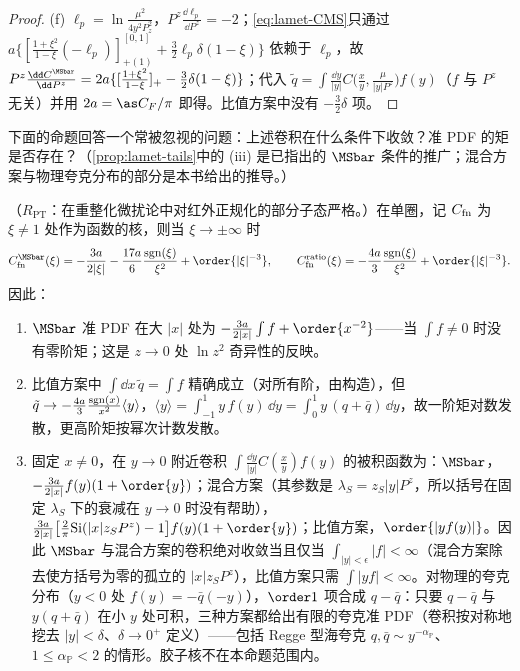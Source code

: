 \begin{proof}
(f) $\ell_p=\ln\frac{\mu^2}{4y^2P_z^2}$，$P^z\frac{\dd\ell_p}{\dd P^z}=-2$；\cref{eq:lamet-CMS}只通过 $a\{[\frac{1+\xi^2}{1-\xi}(-\ell_p)]^{[0,1]}_{+(1)}+\frac32\ell_p\delta(1-\xi)\}$ 依赖于 $\ell_p$，故 $P^z\frac{\dd C^{\MSbar}}{\dd P^z}=2a\{[\frac{1+\xi^2}{1-\xi}]_+-\frac32\delta(1-\xi)\}$；代入 $\tilde q=\int\frac{\dd y}{|y|}C\big(\frac xy,\frac\mu{|y|P^z}\big)f(y)$（$f$ 与 $P^z$ 无关）并用 $2a=\as C_F/\pi$ 即得。比值方案中没有 $-\frac32\delta$ 项。
\end{proof}

下面的命题回答一个常被忽视的问题：上述卷积在什么条件下收敛？准 PDF 的矩是否存在？（\cref{prop:lamet-tails}中的 (iii) 是\cite{IzubuchiEtAl2018}已指出的 $\MSbar$ 条件的推广；混合方案与物理夸克分布的部分是本书给出的推导。）

\begin{proposition}\label{prop:lamet-tails}
（$R_{\mathrm{PT}}$：在重整化微扰论中对红外正规化的部分子态严格。）在单圈，记 $C_{\rm fn}$ 为 $\xi\ne1$ 处作为函数的核，则当 $\xi\to\pm\infty$ 时
\begin{equation}\label{eq:lamet-tails}
C^{\MSbar}_{\rm fn}(\xi)=-\frac{3a}{2|\xi|}-\frac{17a}{6}\frac{{\rm sgn}(\xi)}{\xi^2}+\order{|\xi|^{-3}},\qquad C^{\rm ratio}_{\rm fn}(\xi)=-\frac{4a}{3}\frac{{\rm sgn}(\xi)}{\xi^2}+\order{|\xi|^{-3}}.
\end{equation}%
因此：
\begin{enumerate}[label=(\roman*),leftmargin=2em,itemsep=1pt,topsep=2pt]
\item $\MSbar$ 准 PDF 在大 $|x|$ 处为 $-\frac{3a}{2|x|}\int f+\order{x^{-2}}$——当 $\int f\neq0$ 时没有零阶矩；这是 $z\to0$ 处 $\ln z^2$ 奇异性的反映。
\item 比值方案中 $\int\dd x\,\tilde q=\int f$ 精确成立（对所有阶，由构造），但 $\tilde q\to-\frac{4a}3\frac{{\rm sgn}(x)}{x^2}\langle y\rangle$，$\langle y\rangle=\int_{-1}^1y\,f(y)\,\dd y=\int_0^1y\,(q+\bar q)\,\dd y$，故一阶矩对数发散，更高阶矩按幂次计数发散。
\item 固定 $x\neq0$，在 $y\to0$ 附近卷积 $\int\frac{\dd y}{|y|}C(\frac xy)f(y)$ 的被积函数为：$\MSbar$，$-\frac{3a}{2|x|}f(y)(1+\order{y})$；混合方案（其参数是 $\lambda_S=z_S|y|P^z$，所以括号在固定 $\lambda_S$ 下的衰减在 $y\to0$ 时没有帮助），$\frac{3a}{2|x|}\big[\frac2\pi{\rm Si}(|x|z_SP^z)-1\big]f(y)(1+\order{y})$；比值方案，$\order{|yf(y)|}$。因此 $\MSbar$ 与混合方案的卷积绝对收敛当且仅当 $\int_{|y|<\epsilon}|f|<\infty$（混合方案除去使方括号为零的孤立的 $|x|z_SP^z$），比值方案只需 $\int|yf|<\infty$。对物理的夸克分布（$y<0$ 处 $f(y)=-\bar q(-y)$），$\order1$ 项合成 $q-\bar q$：只要 $q-\bar q$ 与 $y(q+\bar q)$ 在小 $y$ 处可积，三种方案都给出有限的夸克准 PDF（卷积按对称地挖去 $|y|<\delta$、$\delta\to0^+$ 定义）——包括 Regge 型海夸克 $q,\bar q\sim y^{-\alpha_{\mathbb P}}$、$1\le\alpha_{\mathbb P}<2$ 的情形。胶子核不在本命题范围内。
\end{enumerate}
\end{proposition}

